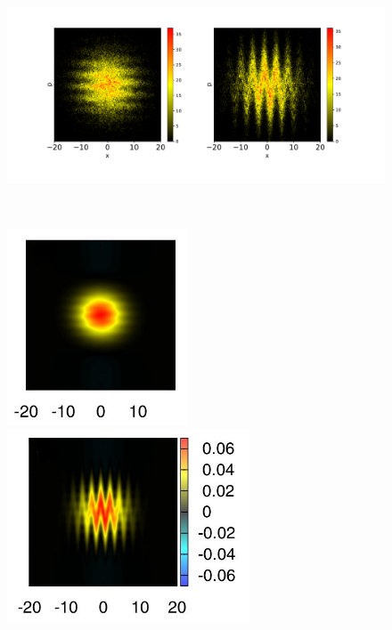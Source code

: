 \documentclass[letterpaper,12pt,oneside]{book}
\begin{document}
\begin{figure}[h!]
	\centering
	\hspace{0.2cm}
	\begin{minipage}{0.8\textwidth}
		\centering
		\includegraphics[width=14.5cm]{Figs/CalorMapk45T5.pdf}
		
	\end{minipage}\\
	\begin{minipage}{0.34\textwidth}
		
		\hspace{0.3cm}
		\includegraphics[width=5.35cm]{Figures/WignerFunctions1}
		
		
	\end{minipage}
	\begin{minipage}{0.34\textwidth}
		\hspace{0.2cm}
		\includegraphics[width=7.2cm]{Figures/WignerFunctions2}
		

\end{minipage}
\end{figure}
\end{document}
